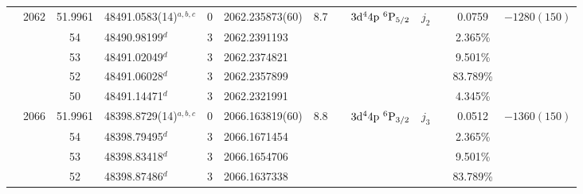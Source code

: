\begin{table*}
\begin{center}
{\begin{tabular}{:l;l;c;l;c;l;c;l;l;c;c;c;c}
                                  & 2062   & 51.9961   & 48491.0583(14)$^{a,b,c}$         & 0 &   2062.235873(60)  &  8.7 & $                                        $ & $3\rm{d}^44\rm{p}~^6\rm{P}_{5/2}         $ & $j_{2} $ &              & 0.0759    & $-1280(150)$\\
\rowstyle{\itshape}               &        & 54        & 48490.98199$^{d}$                & 3 &  2062.2391193      &      & $                                        $ & $                                        $ & $      $ &              & 2.365\%   & $          $\\
\rowstyle{\itshape}               &        & 53        & 48491.02049$^{d}$                & 3 &  2062.2374821      &      & $                                        $ & $                                        $ & $      $ &              & 9.501\%   & $          $\\
\rowstyle{\itshape}               &        & 52        & 48491.06028$^{d}$                & 3 &  2062.2357899      &      & $                                        $ & $                                        $ & $      $ &              & 83.789\%  & $          $\\
\rowstyle{\itshape}               &        & 50        & 48491.14471$^{d}$                & 3 &  2062.2321991      &      & $                                        $ & $                                        $ & $      $ &              & 4.345\%   & $          $\\
                                  & 2066   & 51.9961   & 48398.8729(14)$^{a,b,c}$         & 0 &   2066.163819(60)  &  8.8 & $                                        $ & $3\rm{d}^44\rm{p}~^6\rm{P}_{3/2}         $ & $j_{3} $ &              & 0.0512    & $-1360(150)$\\
\rowstyle{\itshape}               &        & 54        & 48398.79495$^{d}$                & 3 &  2066.1671454      &      & $                                        $ & $                                        $ & $      $ &              & 2.365\%   & $          $\\
\rowstyle{\itshape}               &        & 53        & 48398.83418$^{d}$                & 3 &  2066.1654706      &      & $                                        $ & $                                        $ & $      $ &              & 9.501\%   & $          $\\
\rowstyle{\itshape}               &        & 52        & 48398.87486$^{d}$                & 3 &  2066.1637338      &      & $                                        $ & $                                        $ & $      $ &              & 83.789\%  & $          $\\

\end{tabular}}
\end{center}
\end{table*}
